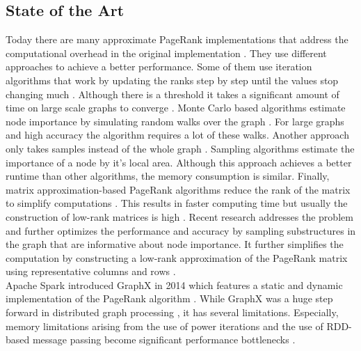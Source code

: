 \documentclass[a4paper,12pt]{article}
\begin{document}
\begin{multicols}{2}
\section{State of the Art}
Today there are many approximate PageRank implementations that address the computational overhead in the original implementation \cite{wu_efficient_2024}. They use different approaches to achieve a better performance. Some of them use iteration algorithms that work by updating the ranks step by step until the values stop changing much \cite{xie_parameterized_2023}\cite{anikin_efficient_2022}. Although there is a threshold it takes a significant amount of time on large scale graphs to converge \cite{wu_efficient_2024}. Monte Carlo based algorithms estimate node importance by simulating random walks over the graph \cite{breyer_markovian_nodate}\cite{noauthor_pdf_2024}. For large graphs and high accuracy the algorithm requires a lot of these walks. Another approach only takes samples instead of the whole graph \cite{wu_approxrank_2009}\cite{noauthor_local_nodate}. Sampling algorithms estimate the importance of a node by it's local area. Although this approach achieves a better runtime than other algorithms, the memory consumption is similar. Finally, matrix approximation-based PageRank algorithms reduce the rank of the matrix to simplify computations \cite{noauthor_fast_nodate}. This results in faster computing time but usually the construction of low-rank matrices is high . Recent research addresses the problem and further optimizes the performance and accuracy by sampling substructures in the graph that are informative about node importance. It further simplifies the computation by constructing a low-rank approximation of the PageRank matrix using representative columns and rows \cite{wu_efficient_2024}. \\Apache Spark introduced GraphX in 2014 which features a static and dynamic implementation of the PageRank algorithm \cite{noauthor_graphx_nodate}. While GraphX was a huge step forward in distributed graph processing \cite{gonzalez_graphx_nodate}, it has several limitations. %
Especially, memory limitations arising from the use of power iterations \cite{page_pagerank_1999} and the use of RDD-based message passing become significant performance bottlenecks \cite{xin_graphx_2014}\cite{xin_graphx_2013}.
 


\end{multicols}
\end{document}
